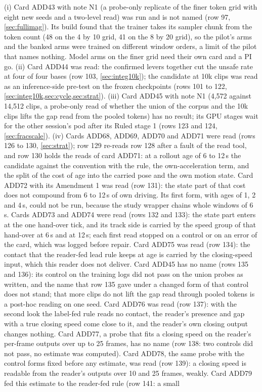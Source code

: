\documentclass[10pt,twocolumn]{article}
\makeatletter
\theoremstyle{remark}
\renewcommand\paragraph{\@startsection{paragraph}{4}{\z@}{1.6ex \@plus .5ex \@minus .2ex}{-1em}{\normalfont\normalsize\bfseries}}
\makeatother
\begin{document}
\paragraph{Running or queued.} (i) Card ADD43 with note N1 (a probe-only replicate of the finer token grid with eight new seeds and a two-level read) was run and is not named (row 97, \cref{sec:fullimag}). Its build found that the trainer takes its sampler chunk from the token count (48 on the 4 by 10 grid, 41 on the 8 by 20 grid), so the pilot's arms and the banked arms were trained on different window orders, a limit of the pilot that names nothing. Model arms on the finer grid need their own card and a PI go. (ii) Card ADD44 was read: the confirmed levers together cut the unsafe rate at four of four bases (row 103, \cref{sec:integ10k}); the candidate at 10k clips was read as an inference-side pre-test on the frozen checkpoints (rows 101 to 122, \cref{sec:integ10k,sec:cycle,sec:strat}). (iii) Card ADD45 with note N1 (4,572 against 14,512 clips, a probe-only read of whether the union of the corpus and the 10k clips lifts the gap read from the pooled tokens) has no result; its GPU stages wait for the other session's pod after its Ruled stage 1 (rows 123 and 124, \cref{sec:fracscale}). (iv) Cards ADD68, ADD69, ADD70 and ADD71 were read (rows 126 to 130, \cref{sec:strat}); row 129 re-reads row 128 after a fault of the read tool, and row 130 holds the reads of card ADD71: at a rollout age of 6 to 12\,s the candidate against the convention with the rule, the own-acceleration term, and the split of the cost of age into the carried pose and the own motion state. Card ADD72 with its Amendment 1 was read (row 131): the state part of that cost does not compound from 6 to 12\,s of own driving. Its first form, with ages of 1, 2 and 4\,s, could not be run, because the study wrapper chains whole windows of 6\,s. Cards ADD73 and ADD74 were read (rows 132 and 133): the state part enters at the one hand-over tick, and its track side is carried by the speed group of that hand-over at 6\,s and at 12\,s; each first read stopped on a control or on an error of the card, which was logged before repair. Card ADD75 was read (row 134): the contact that the reader-fed lead rule keeps at age is carried by the closing-speed input, which this reader does not deliver. Card ADD45 has no name (rows 135 and 136): its control on the training logs did not pass on the union probes as written, and the name that row 135 gave under a changed form of that control does not stand; that more clips do not lift the gap read through pooled tokens is a post-hoc reading on one seed. Card ADD76 was read (row 137): with the second look the label-fed rule reads no contact, the reader's presence and gap with a true closing speed come close to it, and the reader's own closing output changes nothing. Card ADD77, a probe that fits a closing speed on the reader's per-frame outputs over up to 25 frames, has no name (row 138: two controls did not pass, no estimate was computed). Card ADD78, the same probe with the control forms fixed before any estimate, was read (row 139): a closing speed is readable from the reader's outputs over 10 and 25 frames, weakly. Card ADD79 fed this estimate to the reader-fed rule (row 141: a small 
\end{document}
